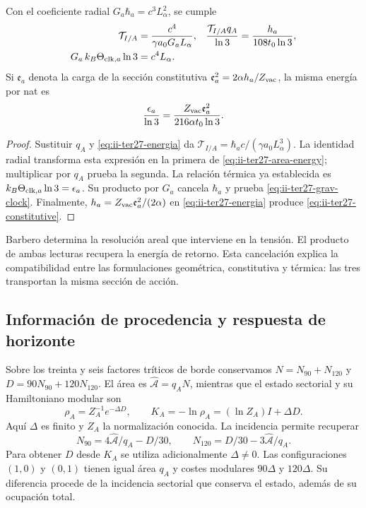 \begin{proposition}
\label{prop:ii-ter27-area}
Con el coeficiente radial $G_a\hbar_a=c^3L_\alpha^2$, se cumple
\begin{align}
 \mathcal T_{I/A}&=\frac{c^4}{\gamma a_0G_aL_\alpha},&
 \frac{\mathcal T_{I/A}q_A}{\ln3}
 &=\frac{h_a}{108t_0\ln3},\label{eq:ii-ter27-area-energy}\\
 G_a\,k_B\Theta_{{\rm clk},a}\ln3&=c^4L_\alpha.&
 \label{eq:ii-ter27-grav-clock}
\end{align}
Si $\mathfrak e_a$ denota la carga de la sección constitutiva
$\mathfrak e_a^2=2\alpha h_a/Z_{\rm vac}$, la misma energía por nat es
\begin{equation}
 \frac{\epsilon_a}{\ln3}
 =\frac{Z_{\rm vac}\mathfrak e_a^2}{216\alpha t_0\ln3}.
 \label{eq:ii-ter27-constitutive}
\end{equation}
\end{proposition}
\begin{proof}
Sustituir $q_A$ y \eqref{eq:ii-ter27-energia} da
$\mathcal T_{I/A}=\hbar_ac/(\gamma a_0L_\alpha^3)$.
La identidad radial transforma esta expresión en la primera de
\eqref{eq:ii-ter27-area-energy}; multiplicar por $q_A$ prueba la segunda.
La relación térmica ya establecida es
$k_B\Theta_{{\rm clk},a}\ln3=\epsilon_a$.
Su producto por $G_a$ cancela $\hbar_a$ y prueba
\eqref{eq:ii-ter27-grav-clock}. Finalmente,
$h_a=Z_{\rm vac}\mathfrak e_a^2/(2\alpha)$ en
\eqref{eq:ii-ter27-energia} produce \eqref{eq:ii-ter27-constitutive}.
\end{proof}

Barbero determina la resolución areal que interviene en la tensión. El
producto de ambas lecturas recupera la energía de retorno. Esta cancelación
explica la compatibilidad entre las formulaciones geométrica, constitutiva
y térmica: las tres transportan la misma sección de acción.

\subsection{Información de procedencia y respuesta de horizonte}
\label{subsec:ii-termica-horizonte}

Sobre los treinta y seis factores tríticos de borde conservamos
$N=N_{90}+N_{120}$ y $D=90N_{90}+120N_{120}$. El área es
$\widehat{\mathcal A}=q_AN$, mientras que el estado sectorial y su
Hamiltoniano modular son
\begin{equation}
 \rho_A=Z_A^{-1}e^{-\Delta D},\qquad
 K_A=-\ln\rho_A=(\ln Z_A)I+\Delta D.
 \label{eq:ii-ter27-modular}
\end{equation}
Aquí $\Delta$ es finito y $Z_A$ la normalización conocida. La incidencia
permite recuperar
\[
 N_{90}=4\widehat{\mathcal A}/q_A-D/30,\qquad
 N_{120}=D/30-3\widehat{\mathcal A}/q_A.
\]
Para obtener $D$ desde $K_A$ se utiliza adicionalmente $\Delta\ne0$.
Las configuraciones $(1,0)$ y $(0,1)$ tienen igual área $q_A$ y costes
modulares $90\Delta$ y $120\Delta$. Su diferencia procede de la
incidencia sectorial que conserva el estado, además de su ocupación total.

